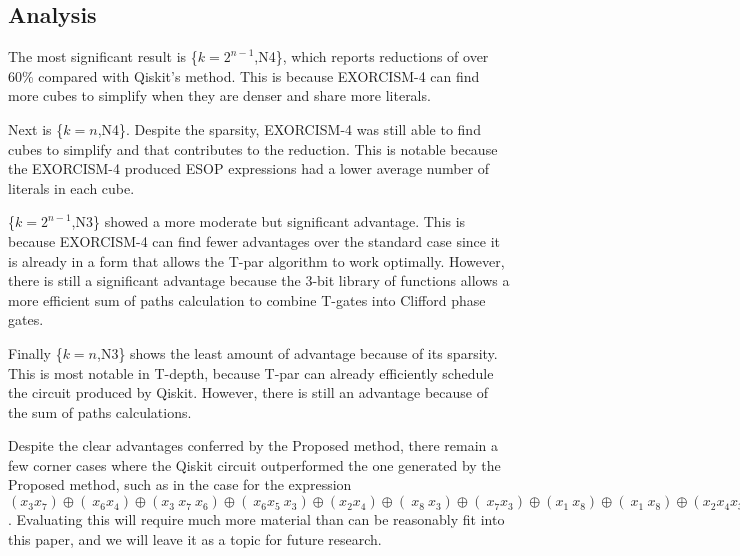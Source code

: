 \subsection{Analysis}
The most significant result is \{$k=2^{n-1}$,N4\}, which reports reductions of over 60\% compared
with Qiskit's method. This is because EXORCISM-4 can find more cubes to simplify when they are
denser and share more literals.

Next is \{$k=n$,N4\}. Despite the sparsity, EXORCISM-4 was still able to find cubes to simplify
and that contributes to the reduction. This is notable because the EXORCISM-4 produced ESOP
expressions had a lower average number of literals in each cube.

\{$k=2^{n-1}$,N3\} showed a more moderate but significant advantage. This is because EXORCISM-4
can find fewer advantages over the standard case since it is already in a form that allows
the T-par algorithm to work optimally. However, there is still a significant advantage because
the 3-bit library of functions allows a more efficient sum of paths calculation to combine
T-gates into Clifford phase gates.

Finally \{$k=n$,N3\} shows the least amount of advantage because of its sparsity. This is most
notable in T-depth, because T-par can already efficiently schedule the circuit produced by Qiskit.
However, there is still an advantage because of the sum of paths calculations.

Despite the clear advantages conferred by the Proposed method, there remain a few corner
cases where the Qiskit circuit outperformed the one generated by the Proposed method, such as
in the case for the expression $(x_3x_7) \oplus (~x_6x_4) \oplus (x_3~x_7~x_6) \oplus (~x_6x_5~x_3) \oplus (x_2x_4) \oplus (~x_8~x_3) \oplus (~x_7x_3) \oplus (x_1~x_8) \oplus (~x_1~x_8) \oplus (x_2x_4x_3) \oplus (x_3x_5) \oplus (~x_7x_6)$.
Evaluating this will require much more material than can be reasonably fit into this paper,
and we will leave it as a topic for future research.

\label{Exp:An}

